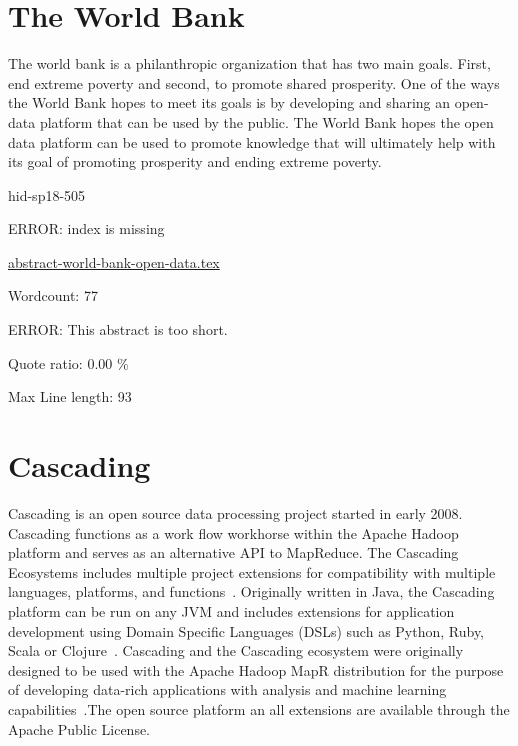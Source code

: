 \section{The World Bank}

The world bank is a philanthropic organization that has two main goals.  First,
end extreme poverty and second, to promote shared prosperity.  One of the ways
the World Bank hopes to meet its goals is by developing and sharing an
open-data platform that can be used by the public.  The World Bank hopes the
open data platform can be used to promote knowledge that will ultimately help
with its goal of promoting prosperity and ending extreme poverty\cite{hid-sp18-505-Bank2018}.


\begin{IU}

hid-sp18-505

ERROR: index is missing

\href{https://github.com/cloudmesh-community/hid-sp18-505/blob/master//technology/abstract-world-bank-open-data.tex}{abstract-world-bank-open-data.tex}

 

Wordcount: 77

ERROR: This abstract is too short.


Quote ratio: 0.00 \%
 
Max Line length: 93
\end{IU}

\section{Cascading}

Cascading is an open source data processing project started in early
2008. Cascading functions as a work flow workhorse within the Apache
Hadoop platform and serves as an alternative API to MapReduce. The
Cascading Ecosystems includes multiple project extensions for
compatibility with multiple languages, platforms, and
functions~\cite{hid-sp18-507-CascadingEco}. Originally written in
Java, the Cascading platform can be run on any JVM and includes
extensions for application development using Domain Specific Languages
(DSLs) such as Python, Ruby, Scala or
Clojure~\cite{hid-sp18-507-GitHubCascading}. Cascading and the
Cascading ecosystem were originally designed to be used with the
Apache Hadoop MapR distribution for the purpose of developing
data-rich applications with analysis and machine learning
capabilities~\cite{hid-sp18-507-MapR}.The open source platform an all
extensions are available through the Apache Public License.


